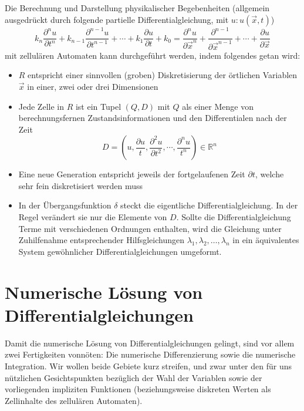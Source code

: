 \documentclass[11pt]{article} %
\theoremstyle{definition}
\begin{document}
Die Berechnung und Darstellung physikalischer Begebenheiten (allgemein ausgedrückt durch folgende partielle Differentialgleichung, mit $u: u(\vec{x}, t)$)
\begin{equation*}
k_n \frac{\partial^n u}{\partial t^n} + k_{n-1} \frac{\partial^{n-1} u}{\partial t^{n-1}} + \cdots + k_1 \frac{\partial u}{\partial t} + k_0 = \frac{\partial^n u}{\partial  \vec{x}^n} + \frac{\partial^{n-1}}{\partial \vec{x}^{n-1}} + \cdots + \frac{\partial u}{\partial \vec{x}}
\end{equation*}
mit zellulären Automaten kann durchgeführt werden, indem folgendes getan wird:
\begin{itemize}
\item $R$ entspricht einer sinnvollen (groben) Diskretisierung der örtlichen Variablen $\vec{x}$ in einer, zwei oder drei Dimensionen
\item Jede Zelle in $R$ ist ein Tupel $(Q, D)$ mit $Q$ als einer Menge von berechnungsfernen Zustandsinformationen und den Differentialen nach der Zeit
\[
D = \left( u, \frac{\partial u}{t}, \frac{\partial^2 u}{\partial t^2}, \cdots, \frac{\partial^n u}{t^n} \right)  \in \mathbb{R}^n
\]
\item Eine neue Generation entspricht jeweils der fortgelaufenen Zeit $\partial t$, welche sehr fein diskretisiert werden muss
\item In der Übergangsfunktion $\delta$ steckt die eigentliche Differentialgleichung. In der Regel verändert sie nur die Elemente von $D$. Sollte die Differentialgleichung Terme mit verschiedenen Ordnungen enthalten, wird die Gleichung unter Zuhilfenahme entsprechender Hilfsgleichungen $\lambda_1, \lambda_2, \dots, \lambda_n$ in ein äquivalentes System gewöhnlicher Differentialgleichungen umgeformt. 
\end{itemize}

\section{Numerische Lösung von Differentialgleichungen}

Damit die numerische Lösung von Differentialgleichungen gelingt, sind vor allem zwei Fertigkeiten vonnöten: Die numerische Differenzierung sowie die numerische Integration. Wir wollen beide Gebiete kurz streifen, und zwar unter den für uns nützlichen Gesichtspunkten bezüglich der Wahl der Variablen sowie der vorliegenden impliziten Funktionen (beziehungsweise diskreten Werten als Zellinhalte des zellulären Automaten).
\end{document}
